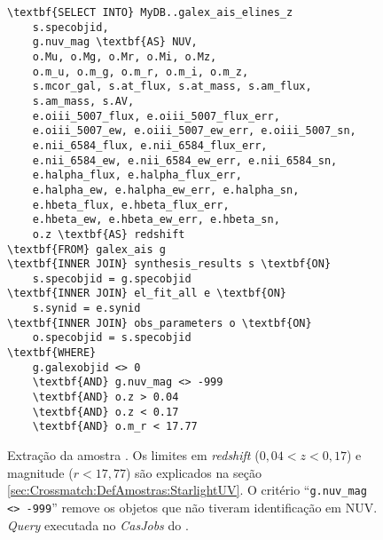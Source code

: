 \begin{figure}
\begin{Verbatim}[frame=single,commandchars=\\\{\}]
\textbf{SELECT INTO} MyDB..galex_ais_elines_z
	s.specobjid,
	g.nuv_mag \textbf{AS} NUV,
	o.Mu, o.Mg, o.Mr, o.Mi, o.Mz,
	o.m_u, o.m_g, o.m_r, o.m_i, o.m_z,
	s.mcor_gal, s.at_flux, s.at_mass, s.am_flux,
	s.am_mass, s.AV,
	e.oiii_5007_flux, e.oiii_5007_flux_err,
	e.oiii_5007_ew, e.oiii_5007_ew_err, e.oiii_5007_sn,
	e.nii_6584_flux, e.nii_6584_flux_err,
	e.nii_6584_ew, e.nii_6584_ew_err, e.nii_6584_sn,
	e.halpha_flux, e.halpha_flux_err,
	e.halpha_ew, e.halpha_ew_err, e.halpha_sn,
	e.hbeta_flux, e.hbeta_flux_err,
	e.hbeta_ew, e.hbeta_ew_err, e.hbeta_sn,
	o.z \textbf{AS} redshift
\textbf{FROM} galex_ais g
\textbf{INNER JOIN} synthesis_results s \textbf{ON}
	s.specobjid = g.specobjid
\textbf{INNER JOIN} el_fit_all e \textbf{ON}
	s.synid = e.synid
\textbf{INNER JOIN} obs_parameters o \textbf{ON}
	o.specobjid = s.specobjid
\textbf{WHERE}
	g.galexobjid <> 0
	\textbf{AND} g.nuv_mag <> -999
	\textbf{AND} o.z > 0.04
	\textbf{AND} o.z < 0.17
	\textbf{AND} o.m_r < 17.77
\end{Verbatim}
	\caption[Extração da amostra \starlightUV.]
	{Extração da amostra \starlightUV. Os limites em {\em redshift}
	($0,04 < z < 0,17$) e magnitude ($r<17,77$) são explicados na seção
	\ref{sec:Crossmatch:DefAmostras:StarlightUV}. O critério ``\texttt{g.nuv\_mag
	<> -999}'' remove os objetos que não tiveram identificação em NUV. {\em Query}
	executada no {\em CasJobs} do \starlight.}
	\label{fig:QuerySampleAIS}
\end{figure}


